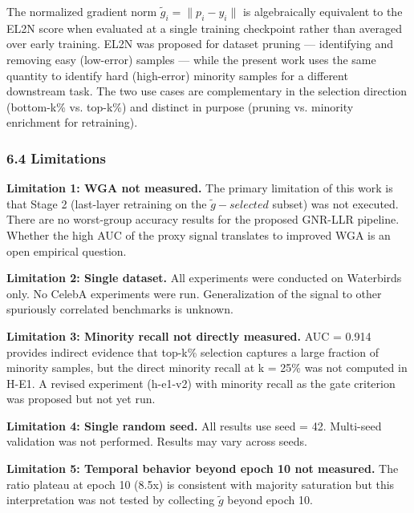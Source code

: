 The normalized gradient norm $\tilde{g}_i = \|p_i - y_{i}\|$ is algebraically equivalent to the EL2N score \citep{Paul2021} when evaluated at a single training checkpoint rather than averaged over early training. EL2N was proposed for dataset pruning --- identifying and removing easy (low-error) samples --- while the present work uses the same quantity to identify hard (high-error) minority samples for a different downstream task. The two use cases are complementary in the selection direction (bottom-k\% vs. top-k\%) and distinct in purpose (pruning vs. minority enrichment for retraining).

\subsubsection{6.4 Limitations}

\textbf{Limitation 1: WGA not measured.} The primary limitation of this work is that Stage 2 (last-layer retraining on the $\tilde{g}-selected$ subset) was not executed. There are no worst-group accuracy results for the proposed GNR-LLR pipeline. Whether the high AUC of the proxy signal translates to improved WGA is an open empirical question.

\textbf{Limitation 2: Single dataset.} All experiments were conducted on Waterbirds only. No CelebA experiments were run. Generalization of the signal to other spuriously correlated benchmarks is unknown.

\textbf{Limitation 3: Minority recall not directly measured.} AUC = 0.914 provides indirect evidence that top-k\% selection captures a large fraction of minority samples, but the direct minority recall at k = 25\% was not computed in H-E1. A revised experiment (h-e1-v2) with minority recall as the gate criterion was proposed but not yet run.

\textbf{Limitation 4: Single random seed.} All results use seed = 42. Multi-seed validation was not performed. Results may vary across seeds.

\textbf{Limitation 5: Temporal behavior beyond epoch 10 not measured.} The ratio plateau at epoch 10 (8.5x) is consistent with majority saturation but this interpretation was not tested by collecting $\tilde{g}$ beyond epoch 10.

